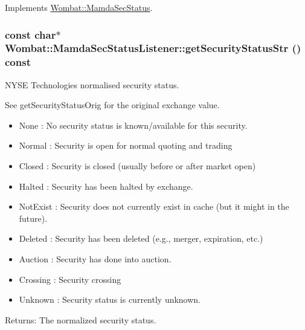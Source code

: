 Implements \hyperlink{classWombat_1_1MamdaSecStatus_db270a035cf0896af0326704b5799689}{Wombat::Mamda\-Sec\-Status}.\hypertarget{classWombat_1_1MamdaSecStatusListener_5d6a7b1c018030dbc0a3839bed5bbccb}{
\subsubsection[getSecurityStatusStr]{\setlength{\rightskip}{0pt plus 5cm}const char$\ast$ Wombat::Mamda\-Sec\-Status\-Listener::get\-Security\-Status\-Str () const}}
\label{classWombat_1_1MamdaSecStatusListener_5d6a7b1c018030dbc0a3839bed5bbccb}


NYSE Technologies normalised security status. 

See get\-Security\-Status\-Orig for the original exchange value.

\begin{itemize}
\item None : No security status is known/available for this security. \item Normal : Security is open for normal quoting and trading \item Closed : Security is closed (usually before or after market open) \item Halted : Security has been halted by exchange. \item Not\-Exist : Security does not currently exist in cache (but it might in the future). \item Deleted : Security has been deleted (e.g., merger, expiration, etc.)  \item Auction : Security has done into auction. \item Crossing : Security crossing \item Unknown : Security status is currently unknown. \end{itemize}


\begin{Desc}
\item[Returns:]The normalized security status. \end{Desc}


